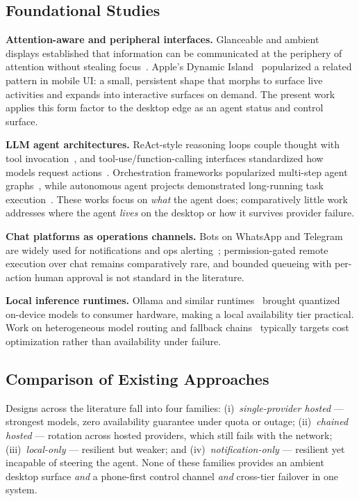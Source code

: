 \documentclass[conference]{IEEEtran}
\begin{document}
\subsection{Foundational Studies}

\textbf{Attention-aware and peripheral interfaces.} Glanceable
and ambient displays established that information can be
communicated at the periphery of attention without stealing
focus~\cite{ambient}. Apple's Dynamic Island~\cite{hig}
popularized a related pattern in mobile UI: a small, persistent
shape that morphs to surface live activities and expands into
interactive surfaces on demand. The present work applies this
form factor to the desktop edge as an agent status and control
surface.

\textbf{LLM agent architectures.} ReAct-style reasoning loops
couple thought with tool invocation~\cite{react}, and
tool-use/function-calling interfaces standardized how models
request actions~\cite{tooluse}. Orchestration frameworks
popularized multi-step agent graphs~\cite{langchain}, while
autonomous agent projects demonstrated long-running task
execution~\cite{autogpt}. These works focus on \emph{what} the
agent does; comparatively little work addresses where the agent
\emph{lives} on the desktop or how it survives provider failure.

\textbf{Chat platforms as operations channels.} Bots on
WhatsApp and Telegram are widely used for notifications and
ops alerting~\cite{whatsapp,telegram}; permission-gated remote
execution over chat remains comparatively rare, and bounded
queueing with per-action human approval is not standard in the
literature.

\textbf{Local inference runtimes.} Ollama and similar
runtimes~\cite{ollama} brought quantized on-device models to
consumer hardware, making a local availability tier practical.
Work on heterogeneous model routing and fallback
chains~\cite{routing} typically targets cost optimization rather
than availability under failure.

\subsection{Comparison of Existing Approaches}

Designs across the literature fall into four families:
(i)~\emph{single-provider hosted} --- strongest models, zero
availability guarantee under quota or outage;
(ii)~\emph{chained hosted} --- rotation across hosted providers,
which still fails with the network;
(iii)~\emph{local-only} --- resilient but weaker; and
(iv)~\emph{notification-only} --- resilient yet incapable of
steering the agent. None of these families provides an ambient
desktop surface \emph{and} a phone-first control channel
\emph{and} cross-tier failover in one system.
\end{document}
